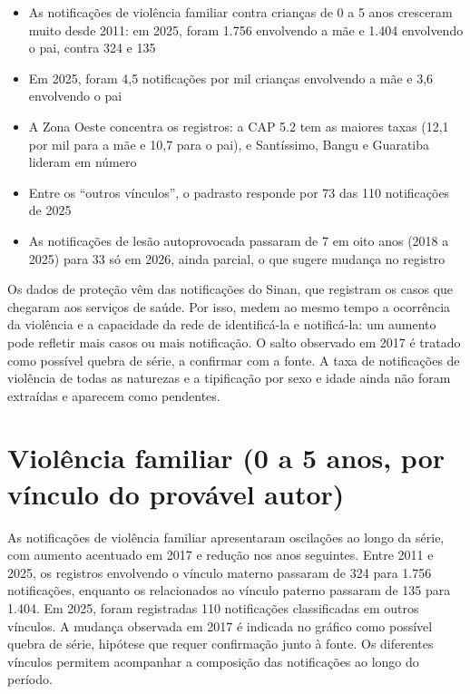 \begin{achados}\begin{itemize}

\item As notificações de violência familiar contra crianças de 0 a 5 anos cresceram muito desde 2011: em 2025, foram 1.756 envolvendo a mãe e 1.404 envolvendo o pai, contra 324 e 135

\item Em 2025, foram 4,5 notificações por mil crianças envolvendo a mãe e 3,6 envolvendo o pai

\item A Zona Oeste concentra os registros: a CAP 5.2 tem as maiores taxas (12,1 por mil para a mãe e 10,7 para o pai), e Santíssimo, Bangu e Guaratiba lideram em número

\item Entre os “outros vínculos”, o padrasto responde por 73 das 110 notificações de 2025

\item As notificações de lesão autoprovocada passaram de 7 em oito anos (2018 a 2025) para 33 só em 2026, ainda parcial, o que sugere mudança no registro

\end{itemize}\end{achados}

Os dados de proteção vêm das notificações do Sinan, que registram os casos que chegaram aos serviços de saúde. Por isso, medem ao mesmo tempo a ocorrência da violência e a capacidade da rede de identificá-la e notificá-la: um aumento pode refletir mais casos ou mais notificação. O salto observado em 2017 é tratado como possível quebra de série, a confirmar com a fonte. A taxa de notificações de violência de todas as naturezas e a tipificação por sexo e idade ainda não foram extraídas e aparecem como pendentes.

\section{Violência familiar (0 a 5 anos, por vínculo do provável autor)}


As notificações de violência familiar apresentaram oscilações ao longo da série, com aumento acentuado em 2017 e redução nos anos seguintes. Entre 2011 e 2025, os registros envolvendo o vínculo materno passaram de 324 para 1.756 notificações, enquanto os relacionados ao vínculo paterno passaram de 135 para 1.404. Em 2025, foram registradas 110 notificações classificadas em outros vínculos. A mudança observada em 2017 é indicada no gráfico como possível quebra de série, hipótese que requer confirmação junto à fonte. Os diferentes vínculos permitem acompanhar a composição das notificações ao longo do período.

